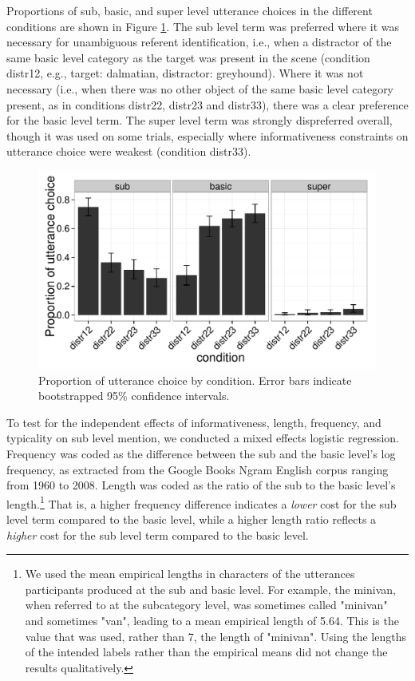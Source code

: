 \documentclass[10pt,letterpaper]{article}
\newcommand{\figref}[1]{Figure \ref{#1}}
\begin{document}
Proportions of sub, basic, and super level utterance choices in the different conditions are shown in \figref{fig:results1}. The sub level term was preferred where it was necessary for unambiguous referent identification, i.e., when a distractor of the same basic level category as the target was present in the scene (condition distr12, e.g., target: dalmatian, distractor: greyhound). Where it was not necessary (i.e., when there was no other object of the same basic level category present, as in conditions distr22, distr23 and distr33), there was a clear preference for the basic level term. The super level term was strongly dispreferred overall, though it was used on some trials, especially where informativeness constraints on utterance choice were weakest (condition distr33). 

\begin{figure}[ht!]
\centering
\includegraphics[width=.5\textwidth]{graphs/results-collapsed}
\caption{Proportion of utterance choice by condition. Error bars indicate bootstrapped 95\% confidence intervals.}
\label{fig:results1}
\end{figure}

To test for the independent effects of informativeness, length, frequency, and typicality on sub level mention, we conducted a mixed effects logistic regression. Frequency was coded as the difference between the sub and the basic level's log frequency, as extracted from the Google Books Ngram English corpus ranging from 1960 to 2008. Length was coded as the ratio of the sub to the basic level's length.\footnote{We used the mean empirical lengths in characters of the utterances participants produced at the sub and basic level. For example, the minivan, when referred to at the subcategory level, was sometimes called "minivan" and sometimes "van", leading to a mean empirical length of 5.64. This is the value that was used, rather than 7, the length of "minivan". Using the lengths of the intended labels rather than the empirical means did not change the results qualitatively.} That is, a higher frequency difference indicates a \emph{lower} cost for the sub level term compared to the basic level, while a higher length ratio reflects a \emph{higher} cost for the sub level term compared to the basic level. 
\end{document}
